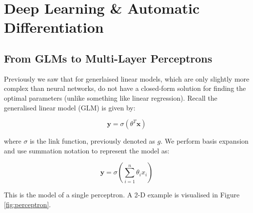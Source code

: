 \chapter{Deep Learning \& Automatic Differentiation}


\section{From GLMs to Multi-Layer Perceptrons}
Previously we saw that for generlaised linear models, which are only slightly more complex than neural networks, do not have a closed-form solution for finding the optimal parameters (unlike something like linear regression). Recall the generalised linear model (GLM) is given by:

\begin{equation}
    \bm{y} = \sigma(\theta^T \bm{x})
\end{equation}

where $\sigma$ is the link function, previously denoted as $g$. We perform basis expansion and use summation notation to represent the model as:

\begin{equation}
    \bm{y} = \sigma\left(\sum_{i=1}^n \theta_i x_i\right)
\end{equation}

This is the model of a single perceptron. A 2-D example is visualised in Figure \ref{fig:perceptron}.




